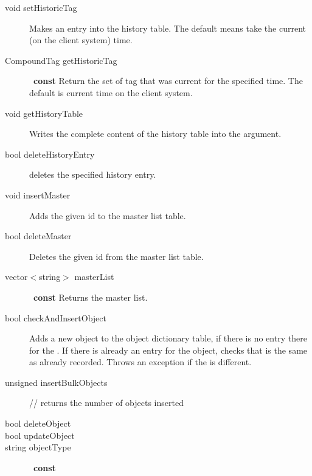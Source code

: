 \begin{description}

\item[void setHistoricTag]
Makes an entry into the history table.  The default 
means take the current (on the client system) time.

\item[CompoundTag getHistoricTag]~\textbf{const}
Return the set of tag that was current for the specified time.  The
default is current time on the client system.

\item[void getHistoryTable]
Writes the complete content of the history table into the argument.

\item[bool deleteHistoryEntry] deletes
  the specified history entry.



\item[void insertMaster] Adds the given id
  to the master list table.

\item[bool deleteMaster] Deletes the given
  id from the master list table.

\item[vector$<$string$>$ masterList]\args{()}~\textbf{const} Returns the master list.

\item[bool checkAndInsertObject] 
  Adds a new object to the object dictionary table, if there is no
  entry there for the .
  If there is already an entry for the object, checks that 
  is the same as already recorded. Throws an exception if the 
  is different.

\item[unsigned  insertBulkObjects] // returns the number of objects inserted

\item[bool deleteObject]
\item[bool updateObject]
\item[string objectType]~\textbf{const}



\end{description}
